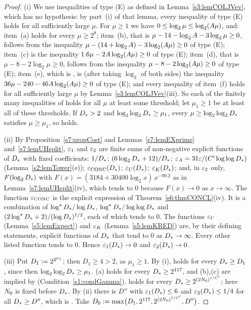 \begin{proof}
(i) We use inequalities of type (E) as defined in Lemma~\ref{s3:lemCOLJVev},
which has no hypothesis: by part~(i) of that lemma, every inequality of type (E)
holds for all sufficiently large $\mu$. For $\mu\ge1$ we have
$0\le\log_2\mu\le\log_2(A\mu)$, and:
item~(a) holds for every $\mu\ge2^8$;
item~(b), that is $\mu-14-\log_2A-3\log_2\mu\ge0$, follows from the
inequality $\mu-(14+\log_2A)-3\log_2(A\mu)\ge0$ of type (E);
item~(c) is the inequality $1.6\mu-2A\log_2(A\mu)\ge0$ of type (E);
item~(d), that is $\mu-8-2\log_2\mu\ge0$, follows from the inequality
$\mu-8-2\log_2(A\mu)\ge0$ of type (E);
item~(e), which is \Gstar, is (after taking $\log_2$ of both sides) the
inequality $36\mu-240-46A\log_2(A\mu)\ge0$ of type (E);
and every inequality of item~(f) holds for all sufficiently large $\mu$ by
Lemma~\ref{s3:lemCOLJVev}(iii).
So each of the finitely many inequalities of  holds for all $\mu$ at least
some threshold; let $\mu_1\ge1$ be at least all of these thresholds. If
$D_{*}>2$ and $\log_2\log_2D_{*}\ge\mu_1$, every $\mu\ge\log_2\log_2D_{*}$
satisfies $\mu\ge\mu_1$, so  holds.

(ii) By Proposition~\ref{s7:propCost} and Lemmas~\ref{s7:lemEXprime}
and~\ref{s7:lemUHsplit}, $\varepsilon_{1}$ and $\varepsilon_{2}$ are finite sums of non-negative
explicit functions of $D_{*}$ with fixed coefficients:
$1/D_{*}$; $(6\log_2D_{*}+12)/D_{*}$;
$\varepsilon_{A}=31\varepsilon/(C'\log\log D_{*})$ (Lemma~\ref{s2:lemTower}(e));
$\varepsilon_{\mathrm{CONC}}(D_{*})$; $\varepsilon_{U}(D_{*})$; $\varepsilon_{K}(D_{*})$; and, in $\varepsilon_{2}$ only,
$F(\log_2D_{*})$ with $F(x)=(3184+30400\log_2x)\,x^{-90.2}$ as in
Lemma~\ref{s7:lemUHsplit}(iv), which tends to $0$ because $F(x)\to0$ as
$x\to\infty$. The function $\varepsilon_{\mathrm{CONC}}$ is the explicit expression
of Theorem~\ref{s6:thmCONCL}(iv). It is a combination of
$\log^{\star}D_{*}/\log D_{*}$, $\log^{\star}D_{*}/\log\log D_{*}$ and
$(2\log^{\star}D_{*}+2)/(\log D_{*})^{1/2}$, each of which tends to $0$. The functions
$\varepsilon_{U}$ (Lemma~\ref{s5:lemExpect}) and $\varepsilon_{K}$ (Lemma~\ref{s5:lemKRED}) are, by
their defining statements, explicit functions of $D_{*}$ that tend to $0$ as
$D_{*}\to\infty$. Every other listed function tends to $0$. Hence
$\varepsilon_{1}(D_{*})\to0$ and $\varepsilon_{2}(D_{*})\to0$.

(iii) Put $D_1\mathrel{:=}2^{2^{\mu_1}}$; then $D_1\ge4>2$, as $\mu_1\ge1$. By (i),
 holds for every $D_{*}\ge D_1$, since then $\log_2\log_2D_{*}\ge\mu_1$.
(a) holds for every $D_{*}\ge2^{117}$, and (b),(c) are implied by
 (Condition~\ref{s1:condGamma}).  holds for every
$D_{*}\ge2^{(2N_{0})^{1/C'}}$; here $N_{0}$ is fixed before $D_{*}$. By (ii)
there is $D''$ with $\varepsilon_{1}(D_{*})\le6$ and $\varepsilon_{2}(D_{*})\le1/4$ for all
$D_{*}\ge D''$, which is . Take
$D_0\mathrel{:=}\max\bigl(D_1,2^{117},2^{(2N_{0})^{1/C'}},D''\bigr)$.
\end{proof}

